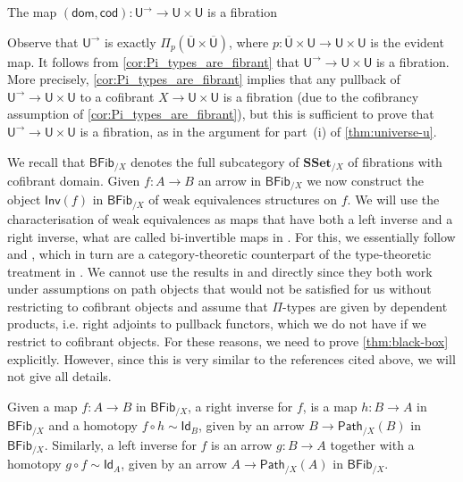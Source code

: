 \documentclass[reqno,10pt,a4paper,oneside,draft]{amsart}
\makeatletter
\renewenvironment{proof}[1][\proofname] {\par\pushQED{\qed}\normalfont\topsep6\p@\@plus6\p@\relax\trivlist\item[\hskip\labelsep\bf#1\@addpunct{.}]\ignorespaces}{\popQED\endtrivlist\@endpefalse}
\numberwithin{equation}{section}
\theoremstyle{mythm}
\theoremstyle{mydef}
\theoremstyle{myrmk}
\newcommand{\ie}{\text{i.e.\ }}
\newcommand{\co}{\colon}
\newcommand{\SSet}{\mathbf{SSet}}
\newcommand{\UU}{\overline{\mathsf{U}}}
\newcommand{\U}{\mathsf{U}}
\newcommand{\Iseq}{\mathsf{Inv}}
\newcommand{\Id}{\mathsf{Id}}
\newcommand{\BFFib}{\mathsf{BFib}}
\newcommand{\Path}{\mathsf{Path}}
\makeatother
\begin{document}
\begin{lemma} The map $(\mathsf{dom}, \mathsf{cod}) \co \U^{\rightarrow} \rightarrow \U \times \U$ is a fibration
\end{lemma}

\begin{proof} Observe that $\U^{\rightarrow}$ is exactly $\Pi_p(\UU \times \UU)$, 
where $p \co \UU \times \U \rightarrow \U \times \U$ is the evident map. 
It follows from \cref{cor:Pi_types_are_fibrant} that $\U^{\rightarrow} \rightarrow \U \times \U$ is a fibration.
More precisely, \cref{cor:Pi_types_are_fibrant} implies that any pullback of  $\U^{\rightarrow} \rightarrow \U \times \U$ to a cofibrant
$X \rightarrow \U \times \U$ is a fibration (due to the cofibrancy assumption of  \cref{cor:Pi_types_are_fibrant}),
but this is sufficient to prove that $\U^{\rightarrow} \rightarrow \U \times \U$ is a fibration,
as in the argument for part~(i) of  \cref{thm:universe-u}.
\end{proof}


We recall that $\BFFib_{/X}$ denotes the full subcategory of $\SSet_{/X}$ of fibrations with cofibrant domain. Given $f \co A \to B$ an arrow in $\BFFib_{/X}$ we now construct the object $\Iseq(f)$ in $\BFFib_{/X}$ of weak equivalences structures on $f$. We will use the 
characterisation of weak equivalences as maps that have both a left inverse and a right inverse, \ie what are called bi-invertible maps in \cite[Section 4.3]{hottbook}. 
For this, we essentially follow \cite{ShulmanM:unifid} and \cite[Section 1.4]{StenzelR:unirca}, which in turn are a category-theoretic counterpart of the type-theoretic
treatment in \cite{hottbook}. We cannot use the results in \cite{ShulmanM:unifid} and \cite[Section 1.4]{StenzelR:unirca} directly since they both work under 
assumptions on path objects that would not be satisfied for us without restricting to cofibrant objects and assume that $\Pi$-types are given by dependent products, i.e. right adjoints to pullback functors, which we do not have if we restrict to cofibrant objects. For these reasons, we need to prove \cref{thm:black-box} explicitly. However, since this is very similar to the references cited above, we will not give all details.



Given a map $f:A \to B$ in $\BFFib_{/X}$, a right inverse for $f$, is a map $h:B \to A$ in $\BFFib_{/X}$ and a homotopy $f \circ h \sim \Id_B$, given by an arrow $B \to \Path_{/X}(B)$ in $\BFFib_{/X}$. Similarly, a left inverse for $f$ is an arrow $g:B \to A$ together with a homotopy $g \circ f \sim \Id_A$, given by an arrow $A \to \Path_{/X}(A)$ in $\BFFib_{/X}$.
\end{document}

